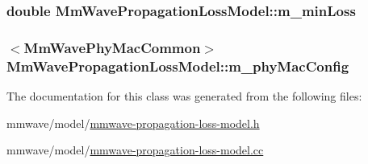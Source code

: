 \subsubsection[{\texorpdfstring{m\+\_\+min\+Loss}{m_minLoss}}]{\setlength{\rightskip}{0pt plus 5cm}double Mm\+Wave\+Propagation\+Loss\+Model\+::m\+\_\+min\+Loss\hspace{0.3cm}{\ttfamily [private]}}\hypertarget{classMmWavePropagationLossModel_a3cba7273e1bb65e9b4c7c918b8f4dd0d}{}\label{classMmWavePropagationLossModel_a3cba7273e1bb65e9b4c7c918b8f4dd0d}
\subsubsection[{\texorpdfstring{m\+\_\+phy\+Mac\+Config}{m_phyMacConfig}}]{$<${\bf Mm\+Wave\+Phy\+Mac\+Common}$>$ Mm\+Wave\+Propagation\+Loss\+Model\+::m\+\_\+phy\+Mac\+Config\hspace{0.3cm}{\ttfamily [private]}}\hypertarget{classMmWavePropagationLossModel_a3f9dc815125ad21c309388b3f387a66b}{}\label{classMmWavePropagationLossModel_a3f9dc815125ad21c309388b3f387a66b}


The documentation for this class was generated from the following files\+:\begin{DoxyCompactItemize}
\item 
mmwave/model/\hyperlink{mmwave-propagation-loss-model_8h}{mmwave-\/propagation-\/loss-\/model.\+h}\item 
mmwave/model/\hyperlink{mmwave-propagation-loss-model_8cc}{mmwave-\/propagation-\/loss-\/model.\+cc}\end{DoxyCompactItemize}
